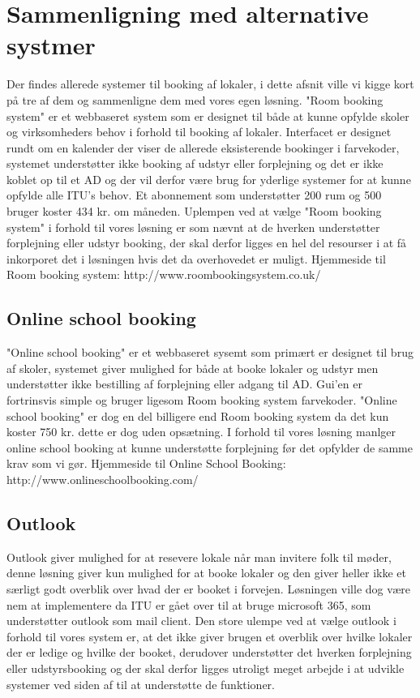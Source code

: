 \section{Sammenligning med alternative systmer}
Der findes allerede systemer til booking af lokaler, i dette afsnit ville vi kigge kort på tre af dem og sammenligne dem med vores egen løsning.
"Room booking system" er et webbaseret system som er designet til både at kunne opfylde skoler og virksomheders behov i forhold til booking af lokaler. Interfacet er designet rundt om en kalender der viser de allerede eksisterende bookinger i farvekoder, systemet understøtter ikke booking af udstyr eller forplejning og det er ikke koblet op til et AD og der vil derfor være brug for yderlige systemer for at kunne opfylde alle ITU's behov. Et abonnement som understøtter 200 rum og 500 bruger koster 434 kr. om måneden. Uplempen ved at vælge "Room booking system" i forhold til vores løsning er som nævnt at de hverken understøtter forplejning eller udstyr booking, der skal derfor ligges en hel del resourser i at få inkorporet det i løsningen hvis det da overhovedet er muligt.
Hjemmeside til Room booking system: http://www.roombookingsystem.co.uk/

\subsection{Online school booking}
"Online school booking" er et webbaseret sysemt som primært er designet til brug af skoler, systemet giver mulighed for både at booke lokaler og udstyr men understøtter ikke bestilling af forplejning eller adgang til AD. Gui'en er fortrinsvis simple og bruger ligesom Room booking system farvekoder. "Online school booking" er dog en del billigere end Room booking system da  det kun koster 750 kr. dette er dog uden opsætning. I forhold til vores løsning manlger online school booking at kunne understøtte forplejning før det opfylder de samme krav som vi gør.
Hjemmeside til Online School Booking: http://www.onlineschoolbooking.com/

\subsection{Outlook}
Outlook giver mulighed for at resevere lokale når man invitere folk til møder, denne løsning giver kun mulighed for at booke lokaler og den giver heller ikke et særligt godt overblik over hvad der er booket i forvejen. Løsningen ville dog være nem at implementere da ITU er gået over til at bruge microsoft 365, som understøtter outlook som mail client. Den store ulempe ved at vælge outlook i forhold til vores system er, at det ikke giver brugen et overblik over hvilke lokaler der er ledige og hvilke der booket, derudover understøtter det hverken forplejning eller udstyrsbooking og der skal derfor ligges utroligt meget arbejde i at udvikle systemer ved siden af til at understøtte de funktioner.